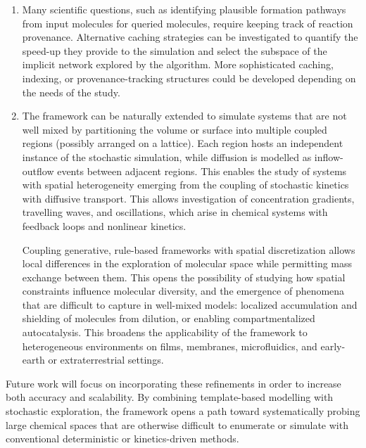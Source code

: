 \begin{enumerate}
    \item Many scientific questions, such as identifying plausible formation pathways from input molecules for queried molecules, require keeping track of reaction provenance. Alternative caching strategies can be investigated to quantify the speed-up they provide to the simulation and select the subspace of the implicit network explored by the algorithm. More sophisticated caching, indexing, or provenance-tracking structures could be developed depending on the needs of the study.
    \item The framework can be naturally extended to simulate systems that are not well mixed by partitioning the volume or surface into multiple coupled regions (possibly arranged on a lattice). Each region hosts an independent instance of the stochastic simulation, while diffusion is modelled as inflow-outflow events between adjacent regions. This enables the study of systems with spatial heterogeneity emerging from the coupling of stochastic kinetics with diffusive transport. This allows investigation of concentration gradients, travelling waves, and oscillations, which arise in chemical systems with feedback loops and nonlinear kinetics.
    
    Coupling generative, rule-based frameworks with spatial discretization allows local differences in the exploration of molecular space while permitting mass exchange between them. This opens the possibility of studying how spatial constraints influence molecular diversity, and the emergence of phenomena that are difficult to capture in well-mixed models: localized accumulation and shielding of molecules from dilution, or enabling compartmentalized autocatalysis. This broadens the applicability of the framework to heterogeneous environments on films, membranes, microfluidics, and early-earth or extraterrestrial settings.
\end{enumerate}

Future work will focus on incorporating these refinements in order to increase both accuracy and scalability. By combining template-based modelling with stochastic exploration, the framework opens a path toward systematically probing large chemical spaces that are otherwise difficult to enumerate or simulate with conventional deterministic or kinetics-driven methods. 

